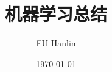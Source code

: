 \documentclass[a4paper,12pt]{book}
\begin{document}
\author{FU Hanlin}
\title{机器学习总结}
\date{\today}

\frontmatter
\maketitle
\tableofcontents

\mainmatter






\backmatter
\end{document}
